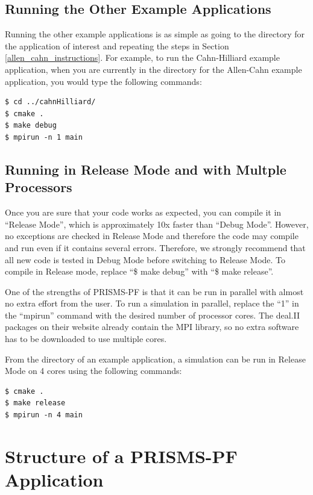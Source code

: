 \documentclass[10pt]{article} %
\begin{document}
\subsection{Running the Other Example Applications}
Running the other example applications is as simple as going to the directory for the application of interest and repeating the steps in Section \ref{allen_cahn_instructions}. For example, to run the Cahn-Hilliard example application, when you are currently in the directory for the Allen-Cahn example application, you would type the following commands:
\begin{lstlisting}
$ cd ../cahnHilliard/ 
$ cmake . 
$ make debug 
$ mpirun -n 1 main 
\end{lstlisting}

\subsection{Running in Release Mode and with Multple Processors} \label{release_multicore}
Once you are sure that your code works as expected, you can compile it in ``Release Mode'', which is approximately 10x faster than ``Debug Mode''. However, no exceptions are checked in Release Mode and therefore the code may compile and run even if it contains several errors. Therefore, we strongly recommend that all new code is tested in Debug Mode before switching to Release Mode. To compile in Release mode, replace ``\$ make debug'' with ``\$ make release''.

One of the strengths of PRISMS-PF is that it can be run in parallel with almost no extra effort from the user. To run a simulation in parallel, replace the ``1'' in the ``mpirun'' command with the desired number of processor cores. The deal.II packages on their website already contain the MPI library, so no extra software has to be downloaded to use multiple cores.

From the directory of an example application, a simulation can be run in Release Mode on 4 cores using the following commands:
\begin{lstlisting}
$ cmake . 
$ make release
$ mpirun -n 4 main 
\end{lstlisting}

\section{Structure of a PRISMS-PF Application}
\end{document}
